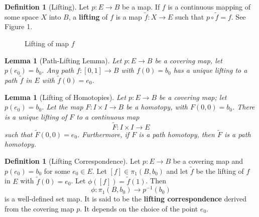 \documentclass{amsart}
\newtheorem{lemma}[theorem]{Lemma}
\theoremstyle{definition}
\newtheorem{definition}[theorem]{Definition}
\theoremstyle{remark}
\numberwithin{equation}{section}
\begin{document}
\begin{definition}[Lifting] Let $p : E \to B$ be a map. If $f$ is a continuous mapping of some space $X$ into $B$, a \textbf{lifting} of $f$ is a map $\tilde{f} : X \to E$ such that $p \circ \tilde{f} = f$. See Figure 1.
\end{definition}

\begin{figure}
    \centering
    \caption{Lifting of map $f$}
\end{figure}

\begin{lemma}[Path-Lifting Lemma] \label{PLL}Let $p : E \to B$ be a covering map, let $p(e_0) = b_0$. Any path $f : [0, 1] \to B$ with $f(0) = b_0$ has a unique lifting to a path $\tilde{f}$ in $E$ with $\tilde{f}(0) = e_0$.
\end{lemma}

\begin{lemma}[Lifting of Homotopies]\label{lift homotopy} Let $p : E \to B$ be a covering map; let $p(e_0) = b_0$. Let the map $F : I \times I \to B$ be a homotopy, with $F(0, 0) = b_0$. There is a unique lifting of $F$ to a continuous map 
\[
\tilde{F} : I \times I \to E
\]
such that $\tilde{F}(0, 0) = e_0$. Furthermore, if $F$ is a path homotopy, then $\tilde{F}$ is a path homotopy.
\end{lemma}

\begin{definition}[Lifting Correspondence] Let $p : E \to B$ be a covering map and $p(e_0) = b_0$ for some $e_0 \in E$. Let $[f] \in \pi_1(B, b_0)$ and let $\tilde{f}$ be the lifting of $f$ in $E$ with $\tilde{f}(0) = e_0$. Let $\phi([f])= \tilde{f}(1)$. Then
\[
\phi : \pi_1(B, b_0) \to p^{-1}(b_0)
\]
is a well-defined set map. It is said to be the \textbf{lifting correspondence} derived from the covering map $p$. It depends on the choice of the point $e_0$. \vspace{1em}
\end{definition}
\end{document}
